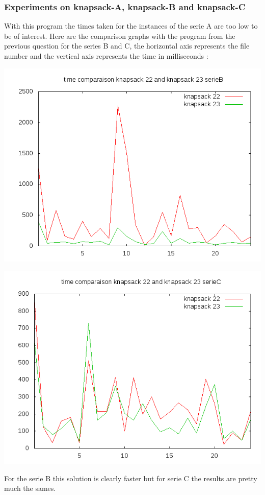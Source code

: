 \documentclass{eplDoc}
\begin{document}
\subsubsection{Experiments on knapsack-A, knapsack-B and knapsack-C}
With this program the times taken for the instances of the serie A are too low to be of interest. 
Here are the comparison graphs with the program from the previous question for the series B and C, the horizontal axis represents the file number and the vertical axis represents the time in milliseconds :  
\begin{center}
\includegraphics[width=\columnwidth]{q323timeB.png}%
\end{center}
\begin{center}
\includegraphics[width=\columnwidth]{q323timeC.png}%
\end{center}

For the serie B this solution is clearly faster but for serie C the results are pretty much the sames. 
\end{document}
